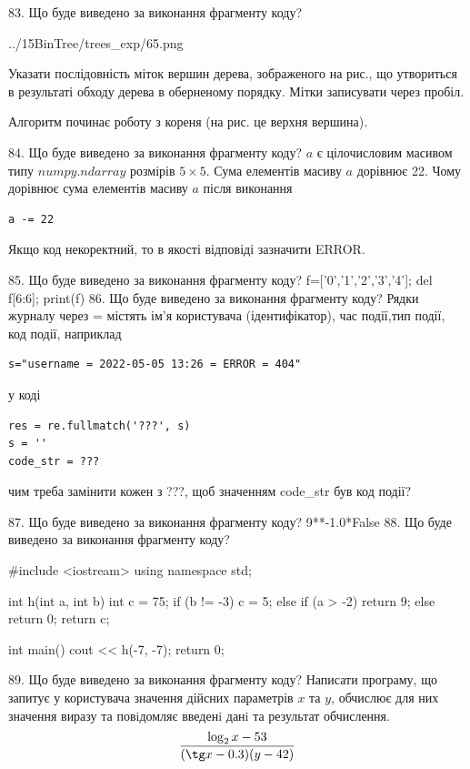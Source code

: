 \documentclass[11pt]{article}
\begin{document}
83. Що буде виведено за виконання фрагменту коду?

\begin{center}
	{../15BinTree/trees_exp/65.png}
\end{center}
Указати послідовність міток вершин дерева, зображеного на рис., що утвориться в результаті обходу дерева в оберненому порядку. Мітки записувати через пробіл.\par Алгоритм починає роботу з кореня (на рис. це верхня вершина).

84. Що буде виведено за виконання фрагменту коду?
$a$ є цілочисловим масивом типу $numpy.ndarray$ розмірів $5{\times}5$. Сума елементів масиву $a$ дорівнює 22. Чому дорівнює сума елементів масиву $a$ після виконання 
\begin{verbatim}
a -= 22
\end{verbatim}


Якщо код некоректний, то в якості відповіді зазначити ERROR.



85. Що буде виведено за виконання фрагменту коду?
f=['0','1','2','3','4']; del f[6:6]; print(f)
86. Що буде виведено за виконання фрагменту коду?
Рядки журналу через = містять ім'я користувача (ідентифікатор), час події,тип події, код події, наприклад
\begin{verbatim}
s="username = 2022-05-05 13:26 = ERROR = 404"
\end{verbatim}
у коді 
\begin{verbatim}
res = re.fullmatch('???', s) 
s = ''
code_str = ??? 
\end{verbatim}
чим треба замінити кожен з ???, щоб значенням code\_str був код події? 



87. Що буде виведено за виконання фрагменту коду?
9**-1.0*False
88. Що буде виведено за виконання фрагменту коду?

#include <iostream>
using namespace std;

int h(int a, int b){
    int c = 75;
    if (b != -3)
        c = 5;
    else if (a > -2)
         return 9;
    else 
        return 0;
    return c;
}

int main(){
    cout << h(-7, -7);
    return 0;
}

89. Що буде виведено за виконання фрагменту коду?
Написати програму, що запитує у користувача значення дійсних параметрів $x$ та $y$, обчислює для них значення виразу та повiдомляє введенi данi та результат обчислення.
$$\frac{\log_{2} x - 53}{(\tg x - 0.3) (y - 42)}$$ 
\end{document}
